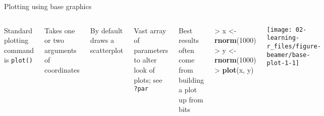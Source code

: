 \documentclass[10pt,ignorenonframetext,compress, aspectratio=169]{beamer}
\newenvironment{Shaded}{\begin{snugshade}}{\end{snugshade}}
\newcommand{\KeywordTok}[1]{\textcolor[rgb]{0.13,0.29,0.53}{\textbf{{#1}}}}
\newcommand{\DecValTok}[1]{\textcolor[rgb]{0.00,0.00,0.81}{{#1}}}
\newcommand{\StringTok}[1]{\textcolor[rgb]{0.31,0.60,0.02}{{#1}}}
\newcommand{\NormalTok}[1]{{#1}}
\newcommand{\columnsbegin}{\begin{columns}}
\newcommand{\columnsend}{\end{columns}}
\begin{document}
\begin{frame}[fragile]{Plotting using base graphics}

\columnsbegin
{}

Standard plotting command is \texttt{plot()}

Takes one or two arguments of coordinates

By default draws a scatterplot

Vast array of parameters to alter look of plots; see \texttt{?par}

Best results often come from building a plot up from bits


\begin{Shaded}
\begin{Highlighting}[]
\NormalTok{>}\StringTok{ }\NormalTok{x <-}\StringTok{ }\KeywordTok{rnorm}\NormalTok{(}\DecValTok{1000}\NormalTok{)}
\NormalTok{>}\StringTok{ }\NormalTok{y <-}\StringTok{ }\KeywordTok{rnorm}\NormalTok{(}\DecValTok{1000}\NormalTok{)}
\NormalTok{>}\StringTok{ }\KeywordTok{plot}\NormalTok{(x, y)}
\end{Highlighting}
\end{Shaded}

\begin{center}\texttt{[image: 02-learning-r\_files/figure-beamer/base-plot-1-1]} \end{center}

\columnsend

\end{frame}
\end{document}
